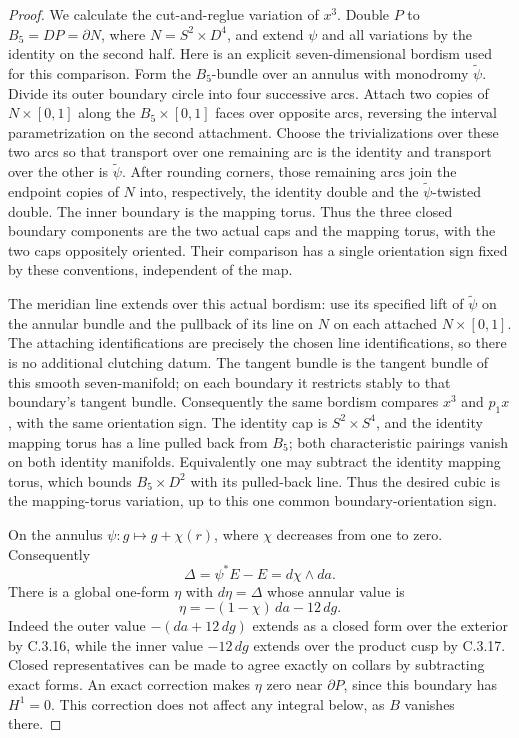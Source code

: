 \begin{proof}
We calculate the cut-and-reglue variation of $x^3$. Double $P$
to $B_5=DP=\partial N$, where $N=S^2\times D^4$, and extend
$\psi$ and all variations by the identity on the second half.
Here is an explicit seven-dimensional bordism used for this
comparison. Form the $B_5$-bundle over an annulus with monodromy
$\widetilde\psi$. Divide its outer boundary circle into four
successive arcs. Attach two copies of $N\times[0,1]$ along the
$B_5\times[0,1]$ faces over opposite arcs, reversing the interval
parametrization on the second attachment. Choose the
trivializations over these two arcs so that transport over one
remaining arc is the identity and transport over the other is
$\widetilde\psi$. After rounding corners, those remaining arcs
join the endpoint copies of $N$ into, respectively, the identity
double and the $\widetilde\psi$-twisted double. The inner boundary
is the mapping torus. Thus the three closed boundary components
are the two actual caps and the mapping torus, with the two caps
oppositely oriented. Their comparison has a single orientation
sign fixed by these conventions, independent of the map.

The meridian line extends over this actual bordism: use its
specified lift of $\widetilde\psi$ on the annular bundle and
the pullback of its line on $N$ on each attached $N\times[0,1]$.
The attaching identifications are precisely the chosen line
identifications, so there is no additional clutching datum.
The tangent bundle is the tangent bundle of this smooth
seven-manifold; on each boundary it restricts stably to that
boundary's tangent bundle. Consequently the same bordism
compares $x^3$ and $p_1x$, with the same orientation sign.
The identity cap is $S^2\times S^4$, and the identity mapping
torus has a line pulled back from $B_5$; both characteristic
pairings vanish on both identity manifolds. Equivalently one
may subtract the identity mapping torus, which bounds
$B_5\times D^2$ with its pulled-back line. Thus the desired
cubic is the mapping-torus variation, up to this one common
boundary-orientation sign.

On the annulus $\psi:g\mapsto g+\chi(r)$, where $\chi$ decreases
from one to zero. Consequently
\[
 \Delta=\psi^*E-E=d\chi\wedge da.
\]
There is a global one-form $\eta$ with $d\eta=\Delta$ whose
annular value is
\[
 \eta=-(1-\chi)\,da-12\,dg.
\]
Indeed the outer value $-(da+12\,dg)$ extends as a closed form
over the exterior by C.3.16, while the inner value $-12\,dg$
extends over the product cusp by C.3.17. Closed representatives
can be made to agree exactly on collars by subtracting exact
forms. An exact correction makes $\eta$ zero near $\partial P$,
since this boundary has $H^1=0$. This correction does not affect
any integral below, as $B$ vanishes there.


\end{proof}
